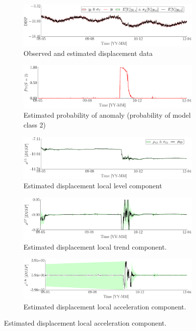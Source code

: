 \begin{figure}[h!]
\centering
\begin{subfigure}{\linewidth}
\includegraphics[width=0.9\linewidth]{./docfigs/Example_DISPSIM_ANOMALY/optim_param_optim_initialhiddenstate/DISP_ObservedPredicted.pdf}
\caption{Observed and estimated displacement data}
\end{subfigure}
\begin{subfigure}{\linewidth}
\includegraphics[width=0.9\linewidth]{./docfigs/Example_DISPSIM_ANOMALY/optim_param_optim_initialhiddenstate/ModelProbability.pdf} 
\caption{Estimated probability of anomaly (probability of model class 2)}
\end{subfigure}
\begin{subfigure}{\linewidth}
\includegraphics[width=0.9\linewidth]{./docfigs/Example_DISPSIM_ANOMALY/optim_param_optim_initialhiddenstate/DISP_LL_1.pdf} 
\caption{Estimated displacement local level component}
\end{subfigure}
\begin{subfigure}{\linewidth}
\includegraphics[width=0.9\linewidth]{./docfigs/Example_DISPSIM_ANOMALY/optim_param_optim_initialhiddenstate/DISP_LT_2.pdf}
\caption{Estimated displacement local trend component.}
\end{subfigure}
\begin{subfigure}{\linewidth}
\includegraphics[width=0.9\linewidth]{./docfigs/Example_DISPSIM_ANOMALY/optim_param_optim_initialhiddenstate/DISP_LAc_3.pdf}
\caption{Estimated displacement local acceleration component.}
\end{subfigure}
\end{figure}
